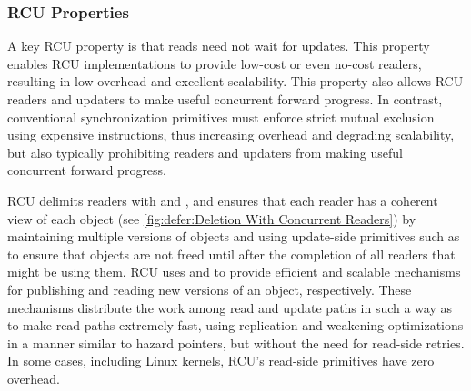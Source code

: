 \subsubsection{RCU Properties}
\label{sec:defer:RCU Properties}

A key RCU property is that reads need not wait for updates.
This property enables RCU implementations to provide low-cost or even
no-cost readers, resulting in low overhead and excellent scalability.
This property also allows RCU readers and updaters to make useful
concurrent forward progress.
In contrast, conventional synchronization primitives must enforce strict
mutual exclusion using expensive instructions, thus increasing overhead
and degrading scalability, but also typically prohibiting readers and
updaters from making useful concurrent forward progress.

\QuickQuizEnd

RCU delimits readers with  and ,
and ensures that each reader has a coherent view of each object
(see \cref{fig:defer:Deletion With Concurrent Readers}) by
maintaining multiple versions of objects and using update-side primitives
such as  to ensure that objects are not
freed until after the completion of all readers that might be using them.
RCU uses  and  to provide
efficient and scalable mechanisms for publishing and reading new versions
of an object, respectively.
These mechanisms distribute the work among read and
update paths in such a way as to make read paths extremely fast, using
replication and weakening optimizations in a manner similar to
hazard pointers, but without the need for read-side retries.
In some cases, including  Linux kernels,
RCU's read-side primitives have zero overhead.

